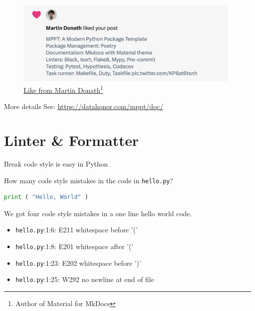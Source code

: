 \documentclass{ctexbeamer}
\begin{document}
\begin{frame}

    \begin{figure}
        \includegraphics[width=0.99\textwidth, height=0.45\textheight]{./figures/like-martin.png}
        \caption{\href{https://twitter.com/MathewShen42/status/1731676210172756029}
        {Like from Martin Donath\footnote{Author of Material for MkDocs}}}
    \end{figure}


\end{frame}

\begin{frame}{More details}
    See: \href{https://datahonor.com/mppt/doc/}{https://datahonor.com/mppt/doc/}
\end{frame}


\section{Linter \& Formatter}

\begin{frame}[fragile]{Break code style is easy in Python}

How many code style mistakes in the code in \texttt{hello.py}?

\begin{lstlisting}[language=Python]
print ( "Hello, World" )
\end{lstlisting}

\pause

\begin{alertblock}{We got four code style mistakes in a one line hello world code.}
    \begin{itemize}
        \item \texttt{hello.py}:1:6: E211 whitespace before '('
        \item \texttt{hello.py}:1:8: E201 whitespace after '('
        \item \texttt{hello.py}:1:23: E202 whitespace before ')'
        \item \texttt{hello.py}:1:25: W292 no newline at end of file
    \end{itemize}
\end{alertblock}

\end{frame}
\end{document}
